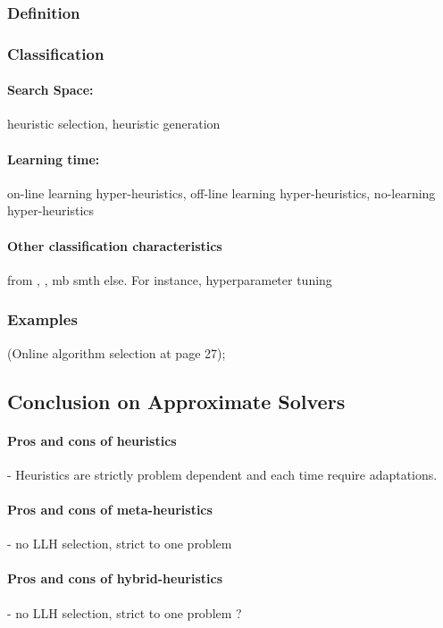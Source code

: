 \subsubsection{Definition}
\subsubsection{Classification}
\paragraph{Search Space:} heuristic selection, heuristic generation
\paragraph{Learning time:} on-line learning hyper-heuristics, off-line learning hyper-heuristics, no-learning hyper-heuristics
\paragraph{Other classification characteristics} from \cite{surv:kerschke2019automated}, \cite{burke2019classification}, mb smth else. For instance, hyperparameter tuning
\subsubsection{Examples}\label{bg: hh examples}%
\cite{surv:drake2019recent} (Online algorithm selection at page 27); \cite{surv:kerschke2019automated}

\subsection{Conclusion on Approximate Solvers}
\paragraph{Pros and cons of heuristics} - Heuristics are strictly problem dependent and each time require adaptations.
\paragraph{Pros and cons of meta-heuristics} - no LLH selection, strict to one problem
\paragraph{Pros and cons of hybrid-heuristics} - no LLH selection, strict to one problem ? 
